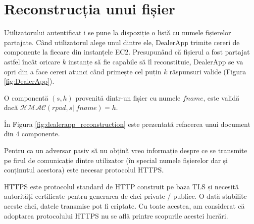 \documentclass[oneside, 12pt]{book}
\begin{document}

\section{Reconstrucția unui fișier}

Utilizatorului autentificat i se pune la dispoziție o listă cu numele fișierelor partajate. Când utilizatorul alege unul dintre ele, DealerApp trimite cereri de componente la fiecare din instanțele EC2. Presupunând că fișierul a fost partajat astfel încât oricare $k$ instanțe să fie capabile să îl reconstituie, DealerApp se va opri din a face cereri atunci când primește cel puțin $k$ răspunsuri valide (Figura \ref{fig:DealerApp}).

O componentă $(s, h)$ provenită dintr-un fișier cu numele $fname$, este validă dacă $\mathcal{HMAC}(rpad, s || fname) = h$.

În Figura \ref{fig:dealerapp_reconstruction} este prezentată refacerea unui document din $4$ componente.

Pentru ca un adversar pasiv să nu obțină vreo informație despre ce se transmite pe firul de comunicație dintre utilizator (în special numele fișierelor dar și conținutul acestora) este necesar protocolul HTTPS.

HTTPS este protocolul standard de HTTP construit pe baza TLS \cite{dierks2008transport} și necesită autorități certificate pentru generarea de chei private / publice. O dată stabilite aceste chei, datele transmise pot fi criptate. Cu toate acestea, am considerat că adoptarea protocolului HTTPS nu se află printre scopurile acestei lucrări.
\end{document}
